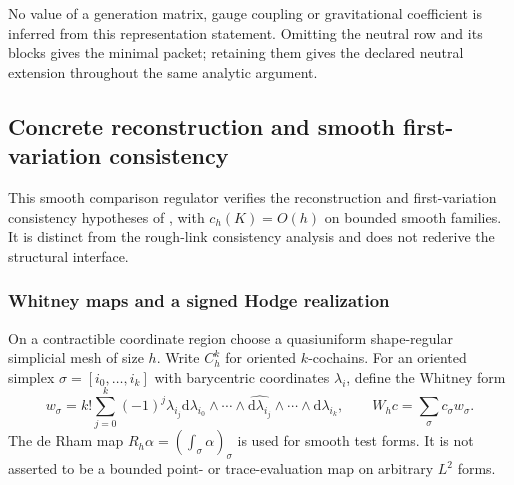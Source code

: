 \documentclass[11pt]{article}
\numberwithin{equation}{section}
\theoremstyle{definition}
\theoremstyle{remark}
\newcommand{\dd}{\mathrm d}
\begin{document}
No value of a generation matrix, gauge coupling or gravitational coefficient
is inferred from this representation statement.  Omitting the neutral row
and its blocks gives the minimal packet; retaining them gives the declared
neutral extension throughout the same analytic argument.

\subsection{Concrete reconstruction and smooth first-variation consistency}
\label{app:reconstruction}

This smooth comparison regulator verifies the reconstruction and
first-variation consistency hypotheses of , with
$c_h(K)=O(h)$ on bounded smooth families. It is distinct from the rough-link
consistency analysis and does not rederive the structural interface.

\subsubsection{Whitney maps and a signed Hodge realization}

On a contractible coordinate region choose a quasiuniform shape-regular simplicial mesh of size $h$. Write $C_h^k$ for oriented $k$-cochains. For an oriented simplex $\sigma=[i_0,\ldots,i_k]$ with barycentric coordinates $\lambda_i$, define the Whitney form
\begin{equation}
 w_\sigma=k!\sum_{j=0}^k(-1)^j\lambda_{i_j}
  \dd\lambda_{i_0}\wedge\cdots\wedge
  \widehat{\dd\lambda_{i_j}}\wedge\cdots\wedge\dd\lambda_{i_k},
 \qquad W_hc=\sum_\sigma c_\sigma w_\sigma.
 \label{eq:Whitney}
\end{equation}
The de Rham map $R_h\alpha=(\int_\sigma\alpha)_\sigma$ is used for smooth test forms. It is not asserted to be a bounded point- or trace-evaluation map on arbitrary $L^2$ forms.
\end{document}
